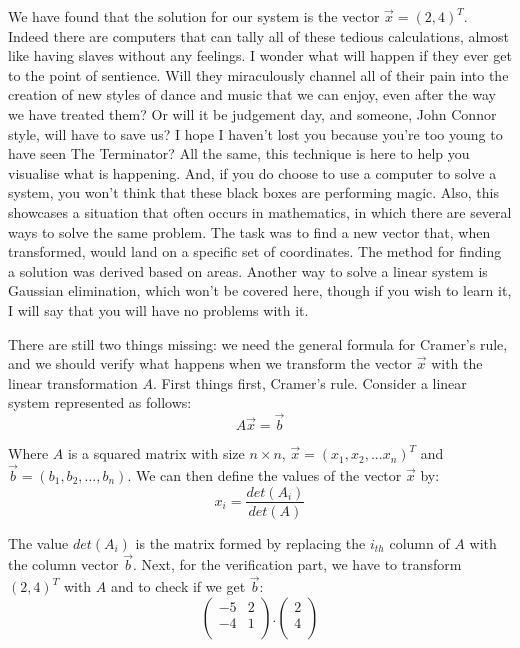 \documentclass[a4,12pt,twosided,openany]{memoir}
\begin{document}
We have found that the solution for our system is the vector $\overrightarrow{x} = (2,4)^T$. Indeed there are computers that can tally all of these tedious calculations, almost like having slaves without any feelings. I wonder what will happen if they ever get to the point of sentience. Will they miraculously channel all of their pain into the creation of new styles of dance and music that we can enjoy, even after the way we have treated them? Or will it be judgement day, and someone, John Connor style, will have to save us? I hope I haven’t lost you because you’re too young to have seen The Terminator? All the same, this technique is here to help you visualise what is happening. And, if you do choose to use a computer to solve a system, you won’t think that these black boxes are performing magic. Also, this showcases a situation that often occurs in mathematics, in which there are several ways to solve the same problem. The task was to find a new vector that, when transformed, would land on a specific set of coordinates. The method for finding a solution was derived based on areas. Another way to solve a linear system is Gaussian elimination, which won’t be covered here, though if you wish to learn it, I will say that you will have no problems with it.  
\par 
\indent
There are still two things missing: we need the general formula for Cramer’s rule, and we should verify what happens when we transform the vector $\overrightarrow{x}$ with the linear transformation $A$. First things first, Cramer’s rule. Consider a linear system represented as follows:
\[A\overrightarrow{x} = \overrightarrow{b} \]
\par 
\indent
Where $A$ is a squared matrix with size $n \times n$, $\overrightarrow{x} = (x_1,x_2,...x_n)^T$ and $\overrightarrow{b} = (b_1,b_2,...,b_n)$. We can then define the values of the vector $\overrightarrow{x}$ by:
\[x_i = \frac{det(A_i)}{det(A)}\]
\par 
\indent
The value $det(A_i)$ is the matrix formed by replacing the $i_{th}$ column of $A$ with the column vector $\overrightarrow{b}$. Next, for the verification part, we have to transform $(2,4)^T$ with $A$ and to check if we get $\overrightarrow{b}$:
\[\begin{pmatrix}
-5 & 2  \\
-4 & 1 \\
\end{pmatrix}.\begin{pmatrix}
2  \\
4  \\
\end{pmatrix}\] 
\end{document}

